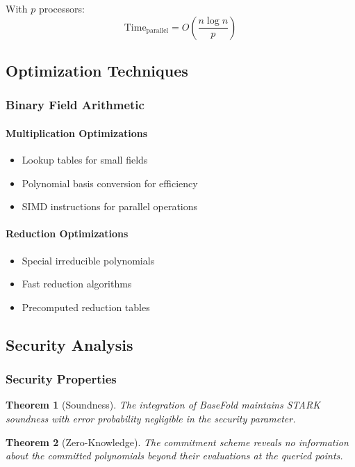 \documentclass{article}
\theoremstyle{plain}
\newtheorem{theorem}{Theorem}[section]
\theoremstyle{definition}
\theoremstyle{remark}
\theoremstyle{problem}
\begin{document}
With $p$ processors:
\[
\text{Time}_{\text{parallel}} = O\left(\frac{n \log n}{p}\right)
\]

\subsection{Optimization Techniques}

\subsubsection{Binary Field Arithmetic}

\paragraph{Multiplication Optimizations}
\begin{itemize}
    \item Lookup tables for small fields
    \item Polynomial basis conversion for efficiency
    \item SIMD instructions for parallel operations
\end{itemize}

\paragraph{Reduction Optimizations}
\begin{itemize}
    \item Special irreducible polynomials
    \item Fast reduction algorithms
    \item Precomputed reduction tables
\end{itemize}

\subsection{Security Analysis}

\subsubsection{Security Properties}

\begin{theorem}[Soundness]
The integration of BaseFold maintains STARK soundness with error probability negligible in the security parameter.
\end{theorem}

\begin{theorem}[Zero-Knowledge]
The commitment scheme reveals no information about the committed polynomials beyond their evaluations at the queried points.
\end{theorem}
\end{document}
